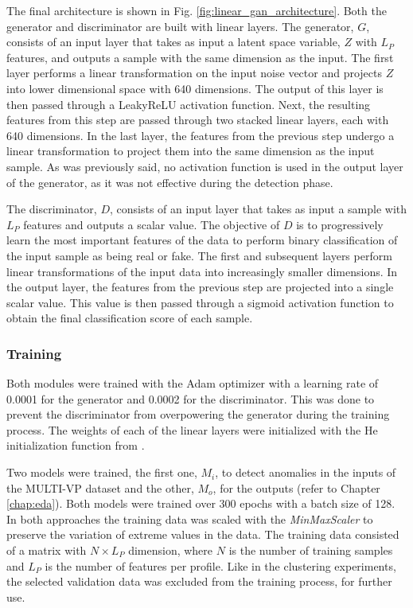 The final architecture is shown in Fig. \ref{fig:linear_gan_architecture}. Both the generator and discriminator are built with linear layers. The generator, $G$, consists of an input layer that takes as input a latent space variable, $Z$ with $L_P$ features, and outputs a sample with the same dimension as the input. The first layer performs a linear transformation on the input noise vector and projects $Z$ into lower dimensional space with 640 dimensions. The output of this layer is then passed through a LeakyReLU activation function. Next, the resulting features from this step are passed through two stacked linear layers, each with 640 dimensions. In the last layer, the features from the previous step undergo a linear transformation to project them into the same dimension as the input sample. As was previously said, no activation function is used in the output layer of the generator, as it was not effective during the detection phase.

The discriminator, $D$, consists of an input layer that takes as input a sample with $L_P$ features and outputs a scalar value. The objective of $D$ is to progressively learn the most important features of the data to perform binary classification of the input sample as being real or fake. The first and subsequent layers perform linear transformations of the input data into increasingly smaller dimensions. In the output layer, the features from the previous step are projected into a single scalar value. This value is then passed through a sigmoid activation function to obtain the final classification score of each sample.

\subsubsection*{Training}
Both modules were trained with the Adam optimizer with a learning rate of 0.0001 for the generator and 0.0002 for the discriminator. This was done to prevent the discriminator from overpowering the generator during the training process. The weights of each of the linear layers were initialized with the He initialization function from \cite{He.Zhang.ea_DelvingDeepRectifiers_2015}.

Two models were trained, the first one, $M_i$, to detect anomalies in the inputs of the MULTI-VP dataset and the other, $M_o$, for the outputs (refer to Chapter \ref{chap:eda}). Both models were trained over 300 epochs with a batch size of 128. In both approaches the training data was scaled with the \textit{MinMaxScaler} to preserve the variation of extreme values in the data. The training data consisted of a matrix with $N\times L_P$ dimension, where $N$ is the number of training samples and $L_P$ is the number of features per profile. Like in the clustering experiments, the selected validation data was excluded from the training process, for further use. 

